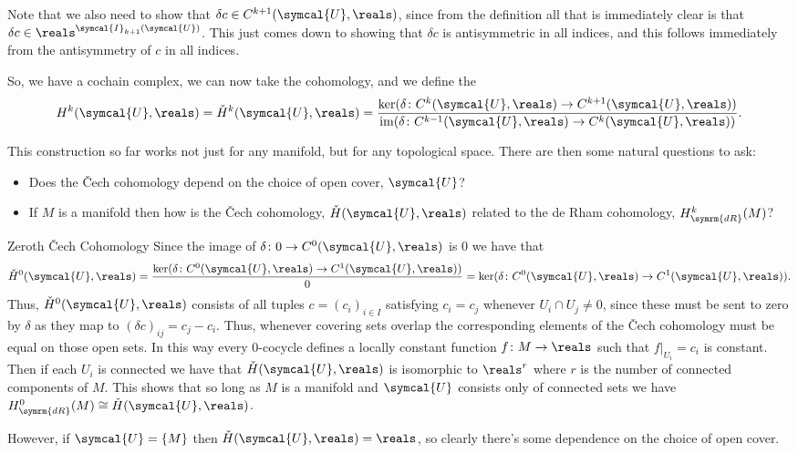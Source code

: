 \documentclass[fleqn]{NotesClass}
\newcommand{\isomorphic}{\cong}
\DeclareMathOperator{\im}{im}
\newcommand{\openCover}{\symcal{U}}
\newcommand{\derham}{\symrm{dR}}
\begin{document}
    Note that we also need to show that \(\delta c \in C^{k + 1}(\openCover, \reals)\), since from the definition all that is immediately clear is that \(\delta c \in \reals^{\symcal{I}_{k+1}(\openCover)}\).
    This just comes down to showing that \(\delta c\) is antisymmetric in all indices, and this follows immediately from the antisymmetry of \(c\) in all indices. 
    
    So, we have a cochain complex, we can now take the cohomology, and we define the 
    \begin{equation}
        H^k(\openCover, \reals) = \check{H}^k(\openCover, \reals) = \frac{\ker(\delta \colon C^k(\openCover, \reals) \to C^{k + 1}(\openCover, \reals))}{\im(\delta \colon C^{k-1}(\openCover, \reals) \to C^k(\openCover, \reals))}.
    \end{equation}
    
    This construction so far works not just for any manifold, but for any topological space.
    There are then some natural questions to ask:
    \begin{itemize}
        \item Does the \v{C}ech cohomology depend on the choice of open cover, \(\openCover\)?
        \item If \(M\) is a manifold then how is the \v{C}ech cohomology, \(\check{H}(\openCover, \reals)\) related to the de Rham cohomology, \(H_{\derham}^k(M)\)?
    \end{itemize}
    
    \begin{exm}{Zeroth \v{C}ech Cohomology}{}
        Since the image of \(\delta \colon 0 \to C^0(\openCover, \reals)\) is \(0\) we have that
        \begin{equation}
            \check{H}^0(\openCover, \reals) = \frac{\ker(\delta \colon C^0(\openCover, \reals) \to C^1(\openCover, \reals))}{0} = \ker(\delta \colon C^0(\openCover, \reals) \to C^1(\openCover, \reals)).
        \end{equation}
        Thus, \(\check{H}^0(\openCover, \reals)\) consists of all tuples \(c = (c_i)_{i \in I}\) satisfying \(c_i = c_j\) whenever \(U_i \cap U_j \ne 0\), since these must be sent to zero by \(\delta\) as they map to \((\delta c)_{ij} = c_j - c_i\).
        Thus, whenever covering sets overlap the corresponding elements of the \v{C}ech cohomology must be equal on those open sets.
        In this way every 0-cocycle defines a locally constant function \(f \colon M \to \reals\) such that \(f|_{U_i} = c_i\) is constant.
        Then if each \(U_i\) is connected we have that \(\check{H}(\openCover, \reals)\) is isomorphic to \(\reals^r\) where \(r\) is the number of connected components of \(M\).
        This shows that so long as \(M\) is a manifold and \(\openCover\) consists only of connected sets we have \(H^0_{\derham}(M) \isomorphic \check{H}(\openCover, \reals)\).
        
        However, if \(\openCover = \{M\}\) then \(\check{H}(\openCover, \reals) = \reals\), so clearly there's some dependence on the choice of open cover.
    \end{exm}
    
\end{document}
